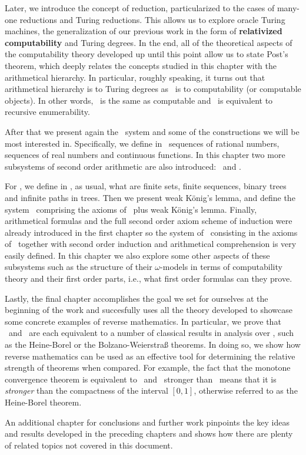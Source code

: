 \documentclass[../main.tex]{memoir}
\begin{document}
Later, we introduce the concept of reduction, particularized to the cases of many-one reductions and Turing reductions. This allows us to explore oracle Turing machines, the generalization of our previous work in the form of \textbf{relativized computability} and Turing degrees. In the end, all of the theoretical aspects of the computability theory developed up until this point allow us to state Post's theorem, which deeply relates the concepts studied in this chapter with the arithmetical hierarchy. In particular, roughly speaking, it turns out that arithmetical hierarchy is to Turing degrees as \rca\ is to computability (or computable objects). In other words, \rec\ is the same as computable and \re\ is equivalent to recursive enumerability.

After that we present again the \rca\ system and some of the constructions we will be most interested in. Specifically, we define in \rca\ sequences of rational numbers, sequences of real numbers and continuous functions. In this chapter two more subsystems of second order arithmetic are also introduced: \wkl\ and \aca.

For \wkl, we define in \rca, as usual, what are finite sets, finite sequences, binary trees and infinite paths in trees. Then we present weak König's lemma, and define the system \wkl\ comprising the axioms of \rca\ plus weak König's lemma. Finally, arithmetical formulas and the full second order axiom scheme of induction were already introduced in the first chapter so the system of \aca\ consisting in the axioms of \rca\ together with second order induction and arithmetical comprehension is very easily defined. In this chapter we also explore some other aspects of these subsystems such as the structure of their $\omega$-models in terms of computability theory and their first order parts, i.e., what first order formulas can they prove.

Lastly, the final chapter accomplishes the goal we set for ourselves at the beginning of the work and succesfully uses all the theory developed to showcase some concrete examples of reverse mathematics. In particular, we prove that \wkl\ and \aca\ are each equivalent to a number of classical results in analysis over \rca, such as the Heine-Borel or the Bolzano-Weierstra{\ss} theorems. In doing so, we show how reverse mathematics can be used as an effective tool for determining the relative strength of theorems when compared. For example, the fact that the monotone convergence theorem is equivalent to \aca\ and \aca\ stronger than \wkl\ means that it is \textit{stronger} than the compactness of the interval $[0, 1]$, otherwise referred to as the Heine-Borel theorem.

An additional chapter for conclusions and further work pinpoints the key ideas and results developed in the preceding chapters and shows how there are plenty of related topics not covered in this document.

\newpage
\end{document}
